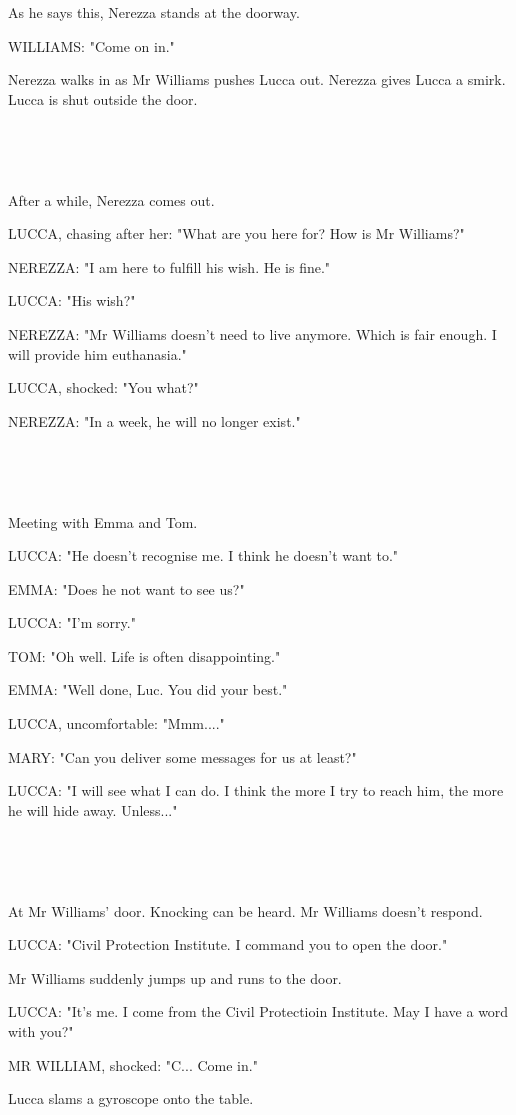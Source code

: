 \documentclass[11pt]{article}
\begin{document}
As he says this, Nerezza stands at the doorway.

WILLIAMS: "Come on in."

Nerezza walks in as Mr Williams pushes Lucca out.
Nerezza gives Lucca a smirk.
Lucca is shut outside the door.

\ 

\ 

After a while, Nerezza comes out.

LUCCA, chasing after her: "What are you here for? How is Mr Williams?"

NEREZZA: "I am here to fulfill his wish.
He is fine."

LUCCA: "His wish?"

NEREZZA: "Mr Williams doesn't need to live anymore.
Which is fair enough.
I will provide him euthanasia."

LUCCA, shocked: "You what?"

NEREZZA: "In a week, he will no longer exist."

\ 

\ 

Meeting with Emma and Tom. 

LUCCA: "He doesn't recognise me.
I think he doesn't want to."

EMMA: "Does he not want to see us?"

LUCCA: "I'm sorry."

TOM: "Oh well. Life is often disappointing."

EMMA: "Well done, Luc. You did your best."

LUCCA, uncomfortable: "Mmm...."

MARY: "Can you deliver some messages for us at least?"

LUCCA: "I will see what I can do.
I think the more I try to reach him, the more he will hide away.
Unless..."

\ 

\ 

At Mr Williams' door.
Knocking can be heard.
Mr Williams doesn't respond.

LUCCA: "Civil Protection Institute.
I command you to open the door."

Mr Williams suddenly jumps up and runs to the door.

LUCCA: "It's me. I come from the Civil Protectioin Institute.
May I have a word with you?"

MR WILLIAM, shocked: "C... Come in."

Lucca slams a gyroscope onto the table.
\end{document}
